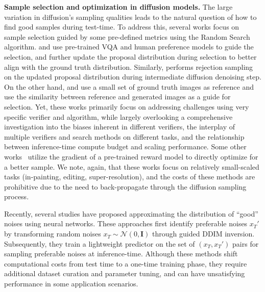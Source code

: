 \textbf{Sample selection and optimization in diffusion models.} The large variation in diffusion's sampling qualities leads to the natural question of how to find good samples during test-time. 
%
To address this, several works focus on sample selection guided by some pre-defined metrics using the Random Search algorithm. \citet{karthik2023if} and \citet{liu2024correcting} use pre-trained VQA and human preference models to guide the selection, and \citet{liu2024correcting} further update the proposal distribution during selection to better align with the ground truth distribution. Similarly, \citet{na2024diffusion} performs rejection sampling on the updated proposal distribution during intermediate diffusion denoising step. On the other hand, \citet{tang2024realfill} and \citet{samuel2024generating} use a small set of ground truth images as reference and use the similarity between reference and generated images as a guide for selection. 
%
Yet, these works primarily focus on addressing challenges using very specific verifier and algorithm, while largely overlooking a comprehensive investigation into the biases inherent in different verifiers, the interplay of multiple verifiers and search methods on different tasks, and the relationship between inference-time compute budget and scaling performance.
%
Some other works~\citep{wallace2023end,ben2024d,novack2024ditto,eyring2024reno,karunratanakul2024optimizing} utilize the gradient of a pre-trained reward model to directly optimize for a better sample. We note, again, that these works focus on relatively small-scaled tasks (in-painting, editing, super-resolution), and the costs of these methods are prohibitive due to the need to back-propagate through the diffusion sampling process.

Recently, several studies\citep{zhou2024goldennoisediffusionmodels, ahn2024noiseworthdiffusionguidance} have proposed approximating the distribution of ``good'' noises using neural networks. These approaches first identify preferable noises $x_T'$ by transforming random noises $x_T \sim \mathcal{N}(0, \mathbf{I})$ through guided DDIM inversion. Subsequently, they train a lightweight predictor on the set of $(x_T, x_T')$ pairs for sampling preferable noises at inference-time. Although these methods shift computational costs from test time to a one-time training phase, they require additional dataset curation and parameter tuning, and can have unsatisfying performance in some application scenarios.

\vspace{-0.5cm}
